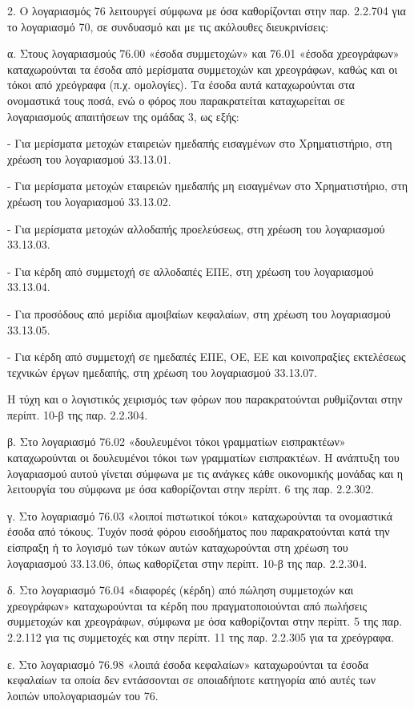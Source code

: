 \documentclass[A4,10pt,greek]{book}
\begin{document}
2. Ο λογαριασμός 76 λειτουργεί σύμφωνα με όσα καθορίζονται στην παρ. 2.2.704 για το λογαριασμό 70, σε συνδυασμό και με τις ακόλουθες διευκρινίσεις:

α. Στους λογαριασμούς 76.00 «έσοδα συμμετοχών» και 76.01 «έσοδα χρεογράφων» καταχωρούνται τα έσοδα από μερίσματα συμμετοχών και χρεογράφων, καθώς και οι τόκοι από χρεόγραφα (π.χ. ομολογίες). Τα έσοδα αυτά καταχωρούνται στα ονομαστικά τους ποσά, ενώ ο φόρος που παρακρατείται καταχωρείται σε λογαριασμούς απαιτήσεων της ομάδας 3, ως εξής:

- Για μερίσματα μετοχών εταιρειών ημεδαπής εισαγμένων στο Χρηματιστήριο, στη χρέωση του λογαριασμού 33.13.01.

- Για μερίσματα μετοχών εταιρειών ημεδαπής μη εισαγμένων στο Χρηματιστήριο, στη χρέωση του λογαριασμού 33.13.02.

- Για μερίσματα μετοχών αλλοδαπής προελεύσεως, στη χρέωση του λογαριασμού 33.13.03.

- Για κέρδη από συμμετοχή σε αλλοδαπές ΕΠΕ, στη χρέωση του λογαριασμού 33.13.04.

- Για προσόδους από μερίδια αμοιβαίων κεφαλαίων, στη χρέωση του λογαριασμού 33.13.05.

- Για κέρδη από συμμετοχή σε ημεδαπές ΕΠΕ, ΟΕ, ΕΕ και κοινοπραξίες εκτελέσεως τεχνικών έργων ημεδαπής, στη χρέωση του λογαριασμού 33.13.07.

Η τύχη και ο λογιστικός χειρισμός των φόρων που παρακρατούνται ρυθμίζονται στην περίπτ. 10-β της παρ. 2.2.304.

β. Στο λογαριασμό 76.02 «δουλευμένοι τόκοι γραμματίων εισπρακτέων» καταχωρούνται οι δουλευμένοι τόκοι των γραμματίων εισπρακτέων. Η ανάπτυξη του λογαριασμού αυτού γίνεται σύμφωνα με τις ανάγκες κάθε οικονομικής μονάδας και η λειτουργία του σύμφωνα με όσα καθορίζονται στην περίπτ. 6 της παρ. 2.2.302.

γ. Στο λογαριασμό 76.03 «λοιποί πιστωτικοί τόκοι» καταχωρούνται τα ονομαστικά έσοδα από τόκους. Τυχόν ποσά φόρου εισοδήματος που παρακρατούνται κατά την είσπραξη ή το λογισμό των τόκων αυτών καταχωρούνται στη χρέωση του λογαριασμού 33.13.06, όπως καθορίζεται στην περίπτ. 10-β της παρ. 2.2.304.

δ. Στο λογαριασμό 76.04 «διαφορές (κέρδη) από πώληση συμμετοχών και χρεογράφων» καταχωρούνται τα κέρδη που πραγματοποιούνται από πωλήσεις συμμετοχών και χρεογράφων, σύμφωνα με όσα καθορίζονται στην περίπτ. 5 της παρ. 2.2.112 για τις συμμετοχές και στην περίπτ. 11 της παρ. 2.2.305 για τα χρεόγραφα.

ε. Στο λογαριασμό 76.98 «λοιπά έσοδα κεφαλαίων» καταχωρούνται τα έσοδα κεφαλαίων τα οποία δεν εντάσσονται σε οποιαδήποτε κατηγορία από αυτές των λοιπών υπολογαριασμών του 76.
\end{document}
